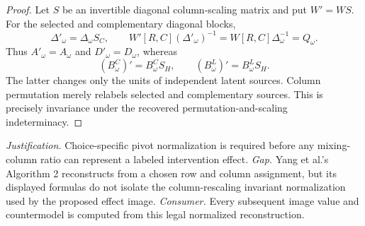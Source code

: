 \documentclass{article}
\begin{document}
\begin{proof}
Let \(S\) be an invertible diagonal column-scaling matrix and put \(W'=WS\). For the selected and complementary diagonal blocks,
\[
\Delta'_\omega=\Delta_\omega S_C,
\qquad W'[R,C](\Delta'_\omega)^{-1}=W[R,C]\Delta_\omega^{-1}=Q_\omega.
\]
Thus \(A'_\omega=A_\omega\) and \(D'_\omega=D_\omega\), whereas
\[
(B^C_\omega)'=B^C_\omega S_H,
\qquad (B^L_\omega)'=B^L_\omega S_H.
\]
The latter changes only the units of independent latent sources. Column permutation merely relabels selected and complementary sources. This is precisely invariance under the recovered permutation-and-scaling indeterminacy.
\end{proof}
\par\smallskip\noindent \textit{Justification.} Choice-specific pivot normalization is required before any mixing-column ratio can represent a labeled intervention effect. \textit{Gap.} Yang et al.'s Algorithm 2 reconstructs from a chosen row and column assignment, but its displayed formulas do not isolate the column-rescaling invariant normalization used by the proposed effect image. \textit{Consumer.} Every subsequent image value and countermodel is computed from this legal normalized reconstruction.
\end{document}

